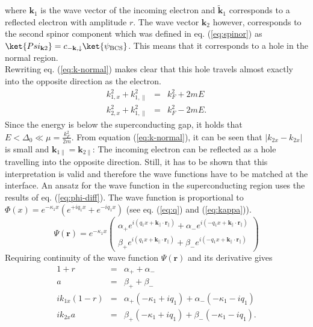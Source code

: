 where $\mathbf{k}_1$ is the wave vector of the incoming electron and $\tilde{\mathbf{k}}_1$ corresponds to a reflected electron with amplitude $r$. The wave vector $\mathbf{k}_2$ however, corresponds to the second spinor component which was defined in eq. (\ref{eq:spinor}) as $\ket{Psi_{\mathbf{k}2}} =  c_{- \mathbf{k}, \downarrow} \ket{\psi_\text{BCS}}$. This means that it corresponds to a hole in the normal region. \\
Rewriting eq. (\ref{eq:k-normal}) makes clear that this hole travels almost exactly into the opposite direction as the electron.
\begin{eqnarray}
k_{1, x}^2 + k_{1, \parallel}^2 &=& k_F^2 + 2mE \\
k_{2, x}^2 + k_{1, \parallel}^2 &=& k_F^2 - 2mE.
\end{eqnarray}
Since the energy is below the superconducting gap, it holds that $E < \Delta_0 \ll \mu = \frac{k_F^2}{2m}$. From equation (\ref{eq:k-normal}), it can be seen that $|k_{2x} - k_{2x}|$ is small and $\mathbf{k}_{1\parallel} = \mathbf{k}_{2\parallel}$: The incoming electron can be reflected as a hole travelling into the opposite direction. Still, it has to be shown that this interpretation is valid and therefore the wave functions have to be matched at the interface.
\newline
An ansatz for the wave function in the superconducting region uses the results of eq. (\ref{eq:phi-diff}). The wave function is proportional to $\Phi \left( x \right) = e^{-\kappa_1 x } \left( e^{+i q_1 x} + e^{- i q_1 x} \right)$ (see eq. (\ref{eq:q}) and (\ref{eq:kappa})).
\begin{equation}
\Psi \left( \mathbf{r} \right) = e^{- \kappa_1 x }  \begin{pmatrix} \alpha_+ e^{i ( q_1x + \mathbf{k}_\parallel \cdot \mathbf{r}_\parallel)} + \alpha_- e^{i ( - q_1x + \mathbf{k}_\parallel \cdot \mathbf{r}_\parallel)}\\ \beta_+ e^{i ( q_1x + \mathbf{k}_\parallel \cdot \mathbf{r}_\parallel)} + \beta_-e^{i ( - q_1x + \mathbf{k}_\parallel \cdot \mathbf{r}_\parallel)} \end{pmatrix}
\end{equation}
Requiring continuity of the wave function  $\Psi \left( \mathbf{r} \right)$ and its derivative gives 
\begin{eqnarray}
1 + r &=& \alpha_+ + \alpha_- \\
a &=& \beta_+ + \beta_- \\
i k_{1x}(1-r) &=& \alpha_+ (-\kappa_1 + i q_1) + \alpha_- ( -\kappa_1 - i q_1) \\
i k_{2x} a &=& \beta_+(-\kappa_1 + i q_1) + \beta_- ( -\kappa_1 - i q_1). \\
\end{eqnarray}
